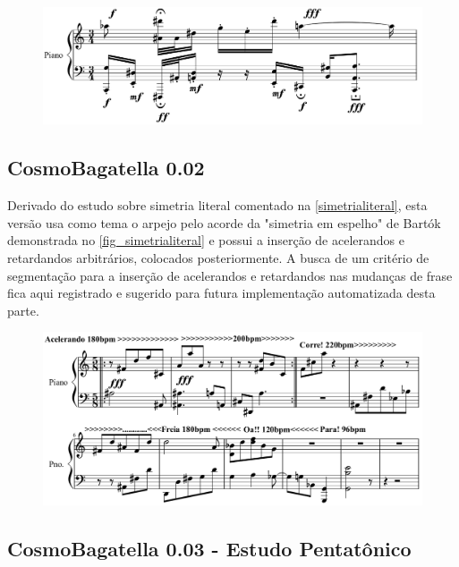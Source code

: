 \documentclass[
	12pt,				%
	openright,			%
	twoside,			%
	a4paper,			%
	english,			%
	french,				%
	spanish,			%
	brazil				%
	]{abntex2}
\begin{document}
\begin{figure}[!h]
	\begin{center}
	    \includegraphics*[scale=0.4]{score/CosmoBagatella001.png}
	\end{center}
\end{figure}

\pagebreak
\subsection{CosmoBagatella 0.02}

Derivado do estudo sobre simetria literal comentado na \autoref{simetrialiteral}, esta versão usa como tema o arpejo pelo acorde da "simetria em espelho" de Bartók demonstrada no \autoref{fig_simetrialiteral} e possui a inserção de acelerandos e retardandos arbitrários, colocados posteriormente. A busca de um critério de segmentação para a inserção de acelerandos e retardandos nas mudanças de frase fica aqui registrado e sugerido para futura implementação automatizada desta parte.


\begin{figure}[!h]
	\begin{center}
	    \includegraphics*[scale=0.4]{score/CosmoBagatella002.png}
	\end{center}
\end{figure}

\subsection{CosmoBagatella 0.03 - Estudo Pentatônico}
\end{document}
